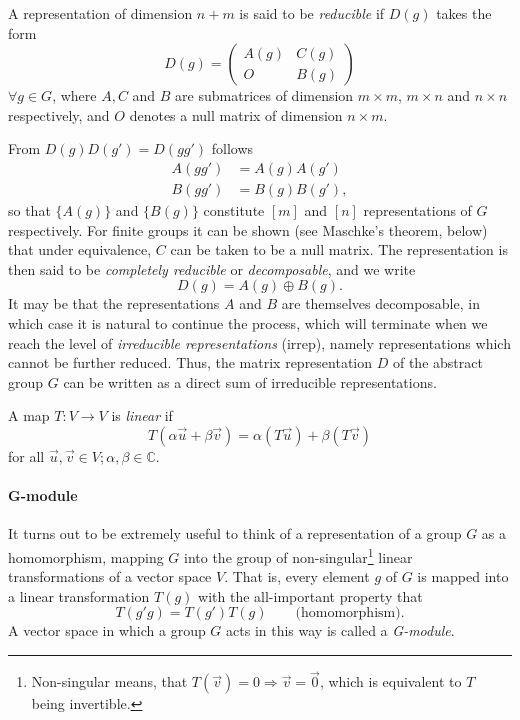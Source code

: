 \documentclass[../../main.tex]{subfiles}
\begin{document}
\begin{definition}
    A representation of dimension $n+m$ is said to be \emph{reducible} if $D(g)$ takes the form
    \begin{equation}
        D(g) = \begin{pmatrix}
            A(g) & C(g) \\
            O & B(g)
        \end{pmatrix} \label{eq:gt_reducible_representation}
    \end{equation} 
    $\forall g \in G$, where $A, C$ and $B$ are submatrices of dimension $m \times m$, $m \times n$ and $n \times n$ respectively, and $O$ denotes a null matrix of dimension $n \times m$.
\end{definition}
From $D(g)D(g') = D(gg')$ follows
\begin{align*}
    A(gg') &= A(g)A(g') \\
    B(gg') &= B(g)B(g') ,
\end{align*} 
so that $\{A(g)\}$ and $\{B(g)\}$ constitute $[m]$ and $[n]$ representations of $G$ respectively. For finite groups it can be shown (see Maschke's theorem, below) that under equivalence, $C$ can be taken to be a null matrix. The representation is then said to be \emph{completely reducible} or \emph{decomposable}, and we write
\begin{equation*}
    D(g) = A(g) \oplus B(g) .
\end{equation*}
It may be that the representations $A$ and $B$ are themselves decomposable, in which case it is natural to continue the process, which will terminate when we reach the level of \emph{irreducible representations} (irrep), namely representations which cannot be further reduced. Thus, the matrix representation $D$ of the abstract group $G$ can be written as a direct sum of irreducible representations.

\begin{definition}
    A map $T: V \rightarrow V$ is \emph{linear} if
    \begin{equation}
        T(\alpha \vec u + \beta \vec v) = \alpha(T \vec u) + \beta (T \vec v)
    \end{equation}
    for all $\vec u, \vec v \in V; \alpha, \beta \in \mathbb{C}$.
\end{definition}

\paragraph{G-module} 
It turns out to be extremely useful to think of a representation of a group $G$ as a homomorphism, mapping $G$ into the group of non-singular\footnote{Non-singular means, that $T(\vec v) = 0 \Rightarrow \vec v = \vec 0$, which is equivalent to $T$ being invertible.} linear transformations of a vector space $V$. That is, every element $g$ of $G$ is mapped into a linear transformation $T(g)$ with the all-important property that 
\begin{equation}
    T(g'g) = T(g')T(g) \qquad \text{(homomorphism)}.
\end{equation}
A vector space in which a group $G$ acts in this way is called a \emph{G-module}.
\end{document}
